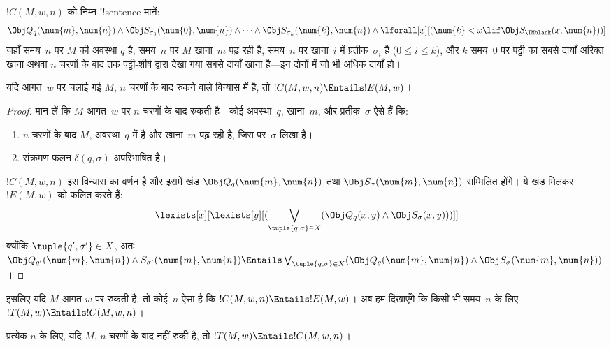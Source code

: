 \documentclass[../../../include/open-logic-section]{subfiles}
\begin{document}
\begin{defn}
$!C(M, w, n)$ को निम्न !!{sentence} मानें:
\[
\Obj Q_q(\num{m}, \num{n}) \land \Obj S_{\sigma_0}(\num{0}, \num{n})
\land \dots \land \Obj S_{\sigma_k}(\num{k}, \num{n}) \land
\lforall[x][(\num{k} < x \lif \Obj S_\TMblank(x, \num{n}))]
\]
जहाँ समय~$n$ पर $M$ की अवस्था $q$ है, समय~$n$ पर $M$ खाना~$m$ पढ़ रही
है, समय~$n$ पर खाना~$i$ में प्रतीक~$\sigma_i$ है ($0 \le i \le k$),
और $k$ समय~$0$ पर पट्टी का सबसे दायाँ अरिक्त खाना अथवा $n$ चरणों के बाद
तक पट्टी-शीर्ष द्वारा देखा गया सबसे दायाँ खाना है---इन दोनों में जो भी
अधिक दायाँ हो।
\end{defn}

\begin{lem}
यदि आगत~$w$ पर चलाई गई $M$, $n$ चरणों के बाद रुकने वाले विन्यास में है,
तो $!C(M, w, n) \Entails !E(M, w)$।
\end{lem}

\begin{proof}
मान लें कि $M$ आगत~$w$ पर $n$ चरणों के बाद रुकती है। कोई अवस्था~$q$,
खाना~$m$, और प्रतीक~$\sigma$ ऐसे हैं कि:
\begin{enumerate}
\item $n$ चरणों के बाद $M$, अवस्था~$q$ में है और खाना~$m$ पढ़ रही है,
  जिस पर~$\sigma$ लिखा है।
\item संक्रमण फलन $\delta(q, \sigma)$ अपरिभाषित है।
\end{enumerate}
$!C(M, w, n)$ इस विन्यास का वर्णन है और इसमें खंड
$\Obj Q_{q}(\num{m}, \num{n})$ तथा
$\Obj S_{\sigma}(\num{m}, \num{n})$ सम्मिलित होंगे। ये खंड मिलकर
$!E(M, w)$ को फलित करते हैं:
\[
\lexists[x][\lexists[y][(\bigvee_{\tuple{q, \sigma} \in
      X}(\Obj Q_q(x, y) \land \Obj S_\sigma(x, y)))]]
\]
क्योंकि $\tuple{q',\sigma'} \in X$, अतः
$\Obj Q_{q'}(\num{m}, \num{n}) \land S_{\sigma'}(\num{m},
\num{n}) \Entails \bigvee_{\tuple{q, \sigma} \in X}
(\Obj Q_q(\num{m}, \num{n}) \land \Obj S_{\sigma}(\num{m}, \num{n}))$।
\end{proof}

\begin{explain}
इसलिए यदि $M$ आगत $w$ पर रुकती है, तो कोई~$n$ ऐसा है कि
$!C(M, w, n) \Entails !E(M,w)$। अब हम दिखाएँगे कि किसी भी समय~$n$ के
लिए $!T(M, w) \Entails !C(M, w, n)$।
\end{explain}

\begin{lem}
प्रत्येक $n$ के लिए, यदि $M$, $n$ चरणों के बाद नहीं रुकी है, तो
$!T(M, w) \Entails !C(M, w, n)$।
\end{lem}
\end{document}
